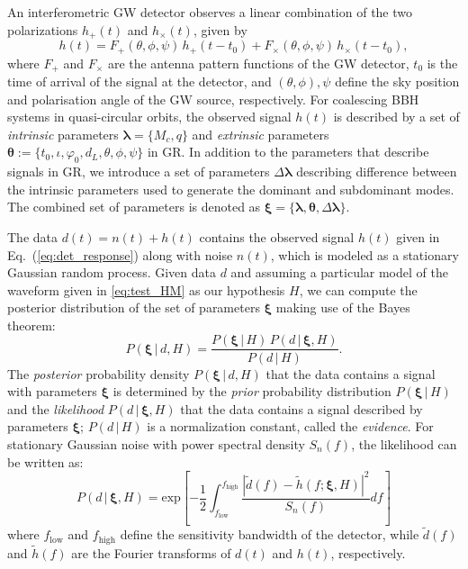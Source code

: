\documentclass[prl,preprintnumbers,twocolumn,eqsecnum,floatfix,a4paper,nofootinbib,superscriptaddress]{revtex4}
\newcommand{\blambda}{\bm{\lambda}}
\newcommand{\btheta}{\bm{\theta}}
\newcommand{\bxi}{\bm{\xi}}
\begin{document}
An interferometric GW detector observes a linear combination of the two polarizations $h_+(t)$ and $h_\times(t)$, given by 
\begin{equation}
h(t) = F_+(\theta, \phi, \psi) \, h_+(t-t_0) + F_{\times}(\theta, \phi, \psi)\, {h}_{\times}(t-t_0), 
\label{eq:det_response}
\end{equation}
where $F_+$ and $F_\times$ are the antenna pattern functions of the GW detector, $t_0$ is the time of arrival of the signal at the detector, and $(\theta, \phi), \psi$ define the sky position and polarisation angle of the GW source, respectively. For coalescing BBH systems in quasi-circular orbits, the observed signal $h(t)$ is described by a set of \emph{intrinsic} parameters $\blambda = \{M_c, q\}$ and \emph{extrinsic} parameters  $\btheta := \{t_0, \iota, \varphi_0, d_L, \theta, \phi, \psi\}$ in GR. In addition to the parameters that describe signals in GR, we introduce a set of parameters $\Delta \blambda$ describing difference between the intrinsic parameters used to generate the dominant and subdominant modes. The combined set of parameters is denoted as $\bxi = \{\blambda, \btheta, \Delta \blambda\}$. 

The data $d(t) = n(t) + h(t)$ contains the observed signal $h(t)$ given in Eq.~(\ref{eq:det_response}) along with noise $n(t)$, which is modeled as a stationary Gaussian random process.
Given data $d$ and assuming a particular model of the waveform given in \eqref{eq:test_HM} as our hypothesis $H$, we can compute the posterior distribution of the set of parameters ${\bxi}$ making use of the Bayes theorem: 
\begin{equation}
P({\bxi} \, | \, d, H) = \frac{P({\bxi} \, | \, H) \, P (d \, | \, {\bxi}, H)}{P(d \, | \, H)}.
\label{eq:Bayes_theorem}
\end{equation} 
The \emph{posterior} probability density $P({\bxi}\,|\,d,H)$ that the data contains a signal with parameters $\bxi$ is determined by the \emph{prior} probability distribution $P({\bxi} \, | \, H)$ and the \emph{likelihood} $P (d \, | \, {\bxi}, H)$ that the data contains a signal described by parameters $\bxi$; $P(d \, | \, H)$ is a normalization constant, called the \emph{evidence}. For stationary Gaussian noise with power spectral density $S_n(f)$, the likelihood can be written as:
\begin{equation}
P (d \, | \, {\bxi}, H) = \text{exp}\left[ -\frac{1}{2}\int_{f_\mathrm{low}}^{f_\mathrm{high}} \frac{|\tilde{d}(f) - \tilde{h}(f;{\bxi}, H)|^2}{S_n(f)}df\right]
\label{eq:likelihood}
\end{equation}
where $f_\mathrm{low}$ and $f_\mathrm{high}$ define the sensitivity bandwidth of the detector, while $\tilde{d}(f)$ and $\tilde{h}(f)$ are the Fourier transforms of $d(t)$ and $h(t)$, respectively. 
\end{document}
